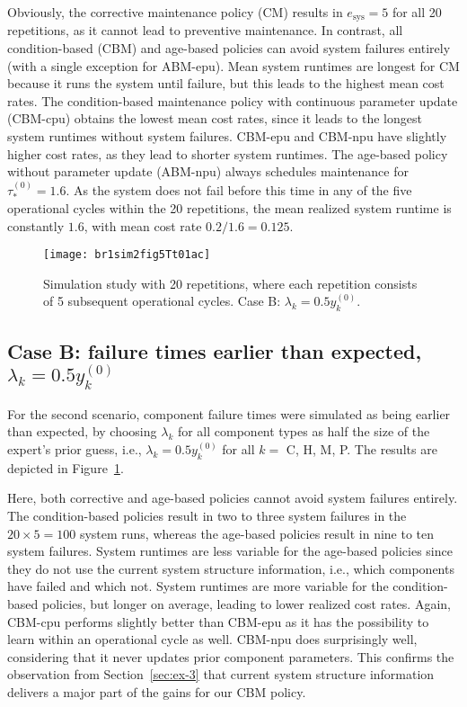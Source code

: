 \documentclass[authoryear]{elsarticle}
\newcommand{\uz}{^{(0)}} %
\def\ykz{y\uz_k}
\newcommand{\esys}{e_\text{sys}}
\begin{document}
Obviously, the corrective maintenance policy (CM) results in $\esys = 5$ for all 20 repetitions,
as it cannot lead to preventive maintenance.
In contrast, all condition-based (CBM) and age-based policies can avoid system failures entirely (with a single exception for ABM-epu).
Mean system runtimes are longest for CM because it runs the system until failure,
but this leads to the highest mean cost rates.
The condition-based maintenance policy with continuous parameter update (CBM-cpu) obtains the lowest mean cost rates,
since it leads to the longest system runtimes without system failures.
CBM-epu and CBM-npu have slightly higher cost rates,
as they lead to shorter system runtimes.
The age-based policy without parameter update (ABM-npu)
always schedules maintenance for $\tau_*^{(0)} = 1.6$.
As the system does not fail before this time in any of the five operational cycles within the 20 repetitions,
the mean realized system runtime is constantly $1.6$, with mean cost rate $0.2 / 1.6 = 0.125$.

\begin{figure}
\texttt{[image: br1sim2fig5Tt01ac]}
\caption{Simulation study with 20 repetitions, where each repetition consists of 5 subsequent operational cycles.
Case B: $\lambda_k = 0.5\ykz$.}
\label{fig:br1sim2fig5Tt01}
\end{figure}

\subsection{Case B: failure times earlier than expected, $\lambda_k = 0.5 \ykz$}
\label{sec:case2}

For the second scenario,
component failure times were simulated as being earlier than expected,
by choosing $\lambda_k$ for all component types as half the size of the expert's prior guess,
i.e., $\lambda_k = 0.5 \ykz$ for all $k =$ C, H, M, P.
The results are depicted in Figure~\ref{fig:br1sim2fig5Tt01}.

Here, both corrective and age-based policies cannot avoid system failures entirely.
The condition-based policies result in two to three system failures in the $20 \times 5 = 100$ system runs,
whereas the age-based policies result in nine to ten system failures.
System runtimes are less variable for the age-based policies
since they do not use the current system structure information, %
i.e., which components have failed and which not. %
System runtimes are more variable for the condition-based policies,
but longer on average, leading to lower realized cost rates.
Again, CBM-cpu performs slightly better than CBM-epu
as it has the possibility to learn within an operational cycle as well.
CBM-npu does surprisingly well, considering that it never updates prior component parameters. 
This confirms the observation from Section~\ref{sec:ex-3}
that current system structure information delivers a major part of the gains for our CBM policy.
\end{document}
